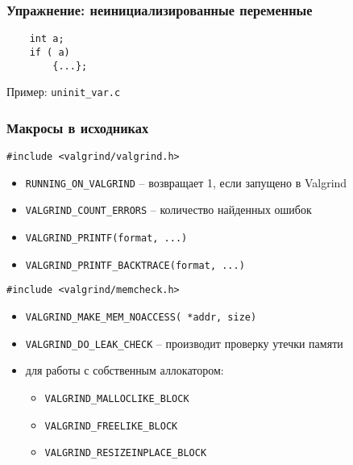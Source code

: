 \begin{frame}[fragile]
	\frametitle{Упражнение: неинициализированные переменные}

	\begin{lstlisting}
    int a;
    if ( a)
        {...};
	\end{lstlisting}

	Пример: {\tt uninit\_var.c}
\end{frame}

\begin{frame}[fragile]
	\frametitle{Макросы в исходниках}
	
	\begin{lstlisting}
#include <valgrind/valgrind.h>
	\end{lstlisting}

	\begin{itemize}
		\item {\tt RUNNING\_ON\_VALGRIND} -- возвращает 1, если запущено в Valgrind
		\item {\tt VALGRIND\_COUNT\_ERRORS} -- количество найденных ошибок
		\item {\tt VALGRIND\_PRINTF(format, ...)}
		\item {\tt VALGRIND\_PRINTF\_BACKTRACE(format, ...)}
	\end{itemize}

	\begin{lstlisting}
#include <valgrind/memcheck.h>
	\end{lstlisting}

	\begin{itemize}
		\item {\tt VALGRIND\_MAKE\_MEM\_NOACCESS( *addr, size)}
		\item {\tt VALGRIND\_DO\_LEAK\_CHECK} -- производит проверку утечки памяти
		\item для работы с собственным аллокатором:\\
		\begin{itemize}
			\item {\tt VALGRIND\_MALLOCLIKE\_BLOCK}
			\item {\tt VALGRIND\_FREELIKE\_BLOCK}
			\item {\tt VALGRIND\_RESIZEINPLACE\_BLOCK}
		\end{itemize}
	\end{itemize}


\end{frame}

